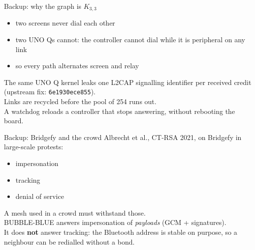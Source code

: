\documentclass[aspectratio=169,11pt]{beamer}
\begin{document}
\begin{frame}{Backup: why the graph is $K_{3,3}$}
\begin{itemize}
  \item two screens never dial each other
  \item two UNO Qs cannot: the controller cannot dial while it is
        peripheral on any link
  \item so every path alternates screen and relay
\end{itemize}
\vspace{4mm}
The same UNO Q kernel leaks one L2CAP signalling identifier per received
credit (upstream fix: \texttt{6e1930ece855}).\\
Links are recycled before the pool of 254 runs out.\\
A watchdog reloads a controller that stops answering, without rebooting
the board.
\end{frame}

\begin{frame}{Backup: Bridgefy and the crowd}
Albrecht et al., CT-RSA 2021, on Bridgefy in large-scale protests:
\begin{itemize}
  \item impersonation
  \item tracking
  \item denial of service
\end{itemize}
\vspace{4mm}
A mesh used in a crowd must withstand those.\\
BUBBLE-BLUE answers impersonation of \emph{payloads} (GCM + signatures).\\
It does \textbf{not} answer tracking: the Bluetooth address is stable on
purpose, so a neighbour can be redialled without a bond.
\end{frame}
\end{document}
